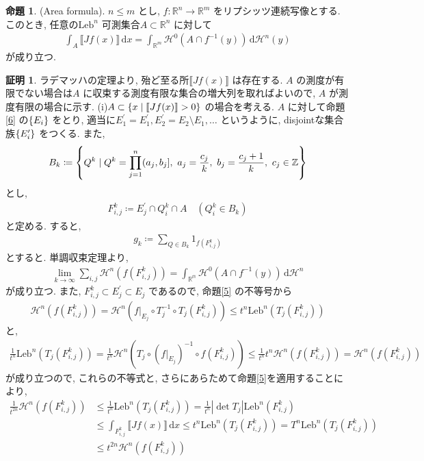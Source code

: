 \documentclass[twocolumn, landscape, a4paper , 8pt, fleqn, titlepage ]{jsarticle}
\theoremstyle{definition}
\newtheorem{prop}[dfn]{命題}
\newtheorem*{pf*}{証明}
\newcommand{\cbra}[1]{\mleft\{#1\mright\}}
\newcommand{\abs}[1]{\left|#1\right|}
\newcommand{\dbra}[1]{\llbracket #1 \rrbracket}
\newcommand{\Leb}{\textrm{Leb}}
\renewcommand{\d}{\, \textrm{d} }
\renewcommand{\-}{\hyphen}
\begin{document}
\begin{prop}(Area formula). \label{8}
$n \leq m$ とし, $f: \mathbb R^n \rightarrow \mathbb R^m$ をリプシッツ連続写像とする. このとき, 任意の$\Leb ^n$ 可測集合$A \subset \mathbb R^n$ に対して
\begin{align*} \int_A \dbra{Jf(x)} \d x = \int_{\mathbb R^m} \mathcal H^0 (A \cap f^{-1} (y)) \d \mathcal H ^n (y) \end{align*}
が成り立つ. 
\end{prop}
\begin{pf*}
ラデマッハの定理より, 殆ど至る所$\dbra{Jf(x)}$ は存在する. $A$ の測度が有限でない場合は$A$ に収束する測度有限な集合の増大列を取ればよいので, $A$ が測度有限の場合に示す. (i)$A \subset \cbra{x \mid \dbra{Jf(x)} > 0}$ の場合を考える. $A$ に対して命題\ref{6} の$\cbra{E_i}$ をとり, 適当に$E^\prime _1 = E^\prime_1, E^\prime_2 = E_2 \setminus E_1, \ldots $ というように, disjointな集合族$\cbra{E^\prime_i}$ をつくる.  また, 
\begin{align*} B_k \coloneqq \cbra{Q^k\mid Q^k = \prod_{j = 1}^n (a_j, b_j], \,\, a_j = \frac{c_j}{k}, \,\, b_j = \frac{c_j + 1}{k}, \,\, c_j \in \mathbb Z } \end{align*}
とし, 
\begin{align*} F^k_{i,j} \coloneqq E^\prime _j \cap Q^k_i \cap A \quad (Q^k_i \in B_k)\end{align*}
と定める. すると, 
\begin{align*} g_k \coloneqq \sum_{Q\in B_k} 1_{f(F^k_{i,j})} \end{align*}
とすると. 単調収束定理より, 
\begin{align*} \lim_{k\rightarrow \infty} \sum_{i,j} \mathcal H^n (f (F^k_{i,j})) = \int_\mathbb {R^m} \mathcal H^0 (A \cap f^{-1} (y)) \d \mathcal H^n \end{align*}
が成り立つ. また, $F^k_{i,j} \subset E^\prime _j \subset E_j$ であるので, 命題\ref{5} の不等号から
\begin{align*} \mathcal H^n (f(F^k_{i,j})) = \mathcal H^n (f|_{E_j} \circ T_j ^{-1} \circ T_j(F^k_{i,j})) \leq t^n \Leb ^n (T_j (F^k_{i,j}))\end{align*}
と, 
\begin{align*} \frac{1}{t^n}  \Leb^n(T_j(F^k_{i,j})) = \frac{1}{t^n} \mathcal H ^n (T_j \circ (f|_{E_j})^{-1} \circ f(F^k_{i,j})) \leq \frac{1}{t^n}  t^n \mathcal H^n (f(F^k_{i,j})) = \mathcal H^n (f(F^k_{i,j})) \end{align*}
が成り立つので, これらの不等式と, さらにあらためて命題\ref{5}を適用することにより, 
\begin{align*} \frac{1}{t^{2n}} \mathcal H^n(f (F^k_{i,j})) &\leq  \frac{1}{t^n}  \Leb^n(T_j(F^k_{i,j})) =\frac{1}{t^n} \abs{\det T_j} \Leb^n(F^k_{i,j}) \\& \leq \int_{F^k_{i,j}} \dbra{Jf(x)} \d x \leq t^n \Leb ^ n (T_j (F^k_{i,j})) = T^n \Leb^n(T_j(F^k_{i,j})) \\&\leq t^{2n} \mathcal H^n (f (F^k_{i,j})) \end{align*}

\end{pf*}
\end{document}

